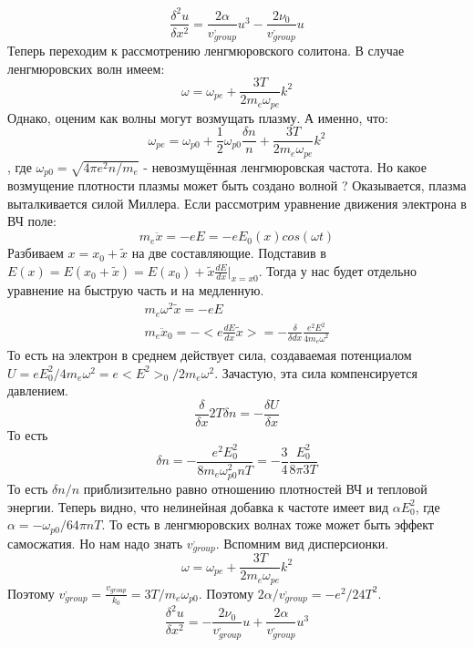 \documentclass[10pt, a4paper]{article}
\begin{document}
\begin{equation}
	\frac{\delta^2 u}{\delta x^2}=\frac{2 \alpha}{ v^{,}_{group}} u^{3} - \frac{2 \nu_0}{ v^{,}_{group}} u
\end{equation}
Теперь переходим к рассмотрению ленгмюровского солитона. В случае ленгмюровских волн имеем:
\begin{equation}
	\omega=\omega_{pe}+\frac{3T}{2 m_e \omega_{pe}} k^2
\end{equation}
Однако, оценим как волны могут возмущать плазму. А именно, что:
\begin{equation}
	\omega_{pe}=\omega_{p0}+ \frac{1}{2} \omega_{p0} \frac{\delta n}{n}+\frac{3T}{2 m_e \omega_{pe}} k^2
\end{equation}
, где $\omega_{p0}=\sqrt{4 \pi e^2 n/m_e}$ - невозмущённая ленгмюровская частота.
Но какое возмущение плотности плазмы может быть создано волной ?
Оказывается, плазма выталкивается силой Миллера. Если рассмотрим уравнение движения электрона в ВЧ поле:
\begin{equation}
	m_e \ddot x=-eE=-eE_0(x) cos(\omega t)
\end{equation}
Разбиваем $x=x_0 + \tilde x$ на две составляющие. Подставив в $E(x)=E(x_0 + \tilde x)=E(x_0)+ \tilde x \frac{dE}{dx} |_{x=x0}$.
Тогда у нас будет отдельно уравнение на быструю часть и на медленную.
\begin{align*}
	m_e \omega^2 \tilde x = -eE \\
	m_e \ddot x_0= - <e  \frac{dE}{dx} \tilde x>=- \frac{\delta}{\delta dx} \frac{e^2 E^2}{4 m_e  \omega^2}
\end{align*}
То есть на электрон в среднем действует сила, создаваемая потенциалом $U=eE^2_0 /4m_e \omega^2=e<E^2>_0 /2m_e \omega^2$. Зачастую, эта сила компенсируется давлением. 
\begin{equation}
	\frac{\delta}{\delta x} 2T \delta n = - \frac{\delta U}{\delta x}
\end{equation}
То есть
\begin{equation}
	\delta n= - \frac{e^2 E^2_0}{8 m_e  \omega^2_{p0} n T }=- \frac{3}{4} \frac{E^2_0}{8 \pi 3T}
\end{equation}
То есть $\delta n/n$ приблизительно равно отношению плотностей ВЧ и тепловой энергии. Теперь видно, что нелинейная добавка к частоте имеет вид $\alpha E^2_0$, где $\alpha= - \omega_{p0}/64 \pi n T$. То есть в ленгмюровских волнах тоже может быть эффект самосжатия.
Но нам надо знать $v^{,}_{group}$. Вспомним вид дисперсионки.
\begin{equation}
	\omega=\omega_{pe}+\frac{3T}{2 m_e \omega_{pe}} k^2
\end{equation}
Поэтому $v^{,}_{group}=\frac{v_{group}}{k_0}=3T/m_e \omega_{p0}$. Поэтому $2 \alpha / v^{,}_{group} = -e^2/24T^2$.
\begin{equation}
	\frac{\delta^2 u}{\delta x^2}=- \frac{2 \nu_0}{ v^{,}_{group}} u +\frac{2 \alpha}{ v^{,}_{group}} u^{3} 
\end{equation}
\end{document}
